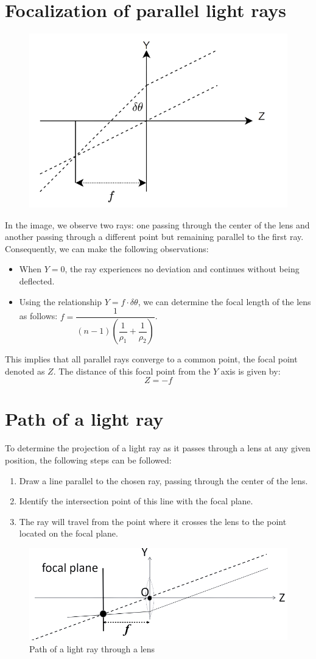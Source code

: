 \documentclass[12pt, a4paper]{report}
\begin{document}
    \section{Focalization of parallel light rays}
    \begin{figure}[H]
        \centering
        \includegraphics[width=0.4\linewidth]{images/focalization.png}
    \end{figure}
    In the image, we observe two rays: one passing through the center of the lens and another passing through a different point but remaining parallel to the first ray. 
    Consequently, we can make the following observations:
    \begin{itemize}
        \item When $Y = 0$, the ray experiences no deviation and continues without being deflected.
        \item Using the relationship $Y=f\cdot\delta\theta$, we can determine the focal length of the lens as follows: $f=\dfrac{1}{(n-1)\left(\dfrac{1}{\rho_1}+\dfrac{1}{\rho_2}\right)}$. 
    \end{itemize}
    This implies that all parallel rays converge to a common point, the focal point denoted as $Z$. 
    The distance of this focal point from the $Y$ axis is given by:
    \[Z=-f\]

    \section{Path of a light ray}
    To determine the projection of a light ray as it passes through a lens at any given position, the following steps can be followed:
    \begin{enumerate}
        \item Draw a line parallel to the chosen ray, passing through the center of the lens. 
        \item Identify the intersection point of this line with the focal plane.
        \item The ray will travel from the point where it crosses the lens to the point located on the focal plane.
    \end{enumerate}
    \begin{figure}[H]
        \centering
        \includegraphics[width=0.4\linewidth]{images/path.png}
        \caption{Path of a light ray through a lens}
    \end{figure}
\end{document}
